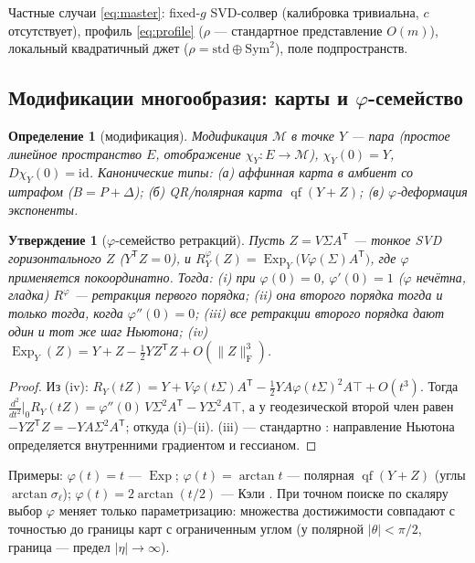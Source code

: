 \documentclass[11pt,a4paper]{article}
\newcommand{\T}{^{\mathsf T}}
\newcommand{\F}{_{\mathrm F}}
\newcommand{\Exp}{\operatorname{Exp}}
\newcommand{\qf}{\operatorname{qf}}
\newtheorem{proposition}[theorem]{Утверждение}
\newtheorem{definition}[theorem]{Определение}
\theoremstyle{remark}
\begin{document}
Частные случаи \eqref{eq:master}: fixed-$g$ SVD-солвер (калибровка тривиальна,
 $c$ отсутствует), профиль \eqref{eq:profile} ($\rho$ --- стандартное
представление $O(m)$), локальный квадратичный джет
($\rho=\mathrm{std}\oplus\mathrm{Sym}^2$), поле подпространств.

\subsection{Модификации многообразия: карты и $\varphi$-семейство}\label{sec:retr}

\begin{definition}[модификация]\label{def:chart}
Модификация $\mathcal M$ в точке $Y$ --- пара (простое линейное пространство
 $E$, отображение $\chi_Y\colon E\to\mathcal M$), $\chi_Y(0)=Y$,
 $D\chi_Y(0)=\mathrm{id}$. Канонические типы:
(а) аффинная карта в амбиент со штрафом ($B=P+\Delta$);
(б) QR/полярная карта $\qf(Y+Z)$;
(в) $\varphi$-деформация экспоненты.
\end{definition}

\begin{proposition}[$\varphi$-семейство ретракций]\label{prop:retr}
Пусть $Z=V\Sigma A\T$ --- тонкое SVD горизонтального $Z$ ($Y\T Z=0$),
и $R^\varphi_Y(Z)=\Exp_Y\bigl(V\varphi(\Sigma)A\T\bigr)$, где $\varphi$ применяется покоординатно. Тогда:
(i) при $\varphi(0)=0$, $\varphi'(0)=1$ ($\varphi$ нечётна, гладка)
 $R^\varphi$ --- ретракция первого порядка;
(ii) она второго порядка тогда и только тогда, когда $\varphi''(0)=0$;
(iii) все ретракции второго порядка дают один и тот же шаг Ньютона;
(iv) $\Exp_Y(Z)=Y+Z-\tfrac12YZ\T Z+O(\|Z\|\F^3)$.
\end{proposition}
\begin{proof}
Из (iv): $R_Y(tZ)=Y+V\varphi(t\Sigma)A\T-\tfrac12YA\varphi(t\Sigma)^2A\top+O(t^3)$.
Тогда $\tfrac{d^2}{dt^2}\big|_0R_Y(tZ)=\varphi''(0)\,V\Sigma^2A\T-Y\Sigma^2A\top$,
а у геодезической второй член равен $-YZ\T Z=-YA\Sigma^2A\T$; откуда (i)--(ii).
(iii) --- стандартно \cite{ams,absilmalick}: направление Ньютона определяется
внутренними градиентом и гессианом.
\end{proof}

Примеры: $\varphi(t)=t$ --- $\Exp$; $\varphi(t)=\arctan t$ --- полярная
 $\qf(Y+Z)$ (углы $\arctan\sigma_\ell$); $\varphi(t)=2\arctan(t/2)$ --- Кэли
\cite{wenyin}. При точном поиске по скаляру выбор $\varphi$ меняет только
параметризацию: множества достижимости совпадают с точностью до границы
карт с ограниченным углом (у полярной $|\theta|<\pi/2$, граница ---
предел $|\eta|\to\infty$).
\end{document}
